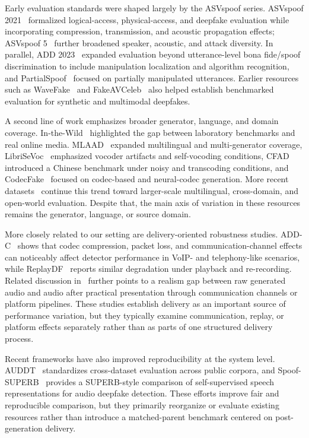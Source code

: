 Early evaluation standards were shaped largely by the ASVspoof series. ASVspoof 2021~\cite{liu2023asvspoof} formalized logical-access, physical-access, and deepfake evaluation while incorporating compression, transmission, and acoustic propagation effects; ASVspoof 5~\cite{wang2026asvspoof} further broadened speaker, acoustic, and attack diversity. In parallel, ADD 2023~\cite{yi2024add} expanded evaluation beyond utterance-level bona fide/spoof discrimination to include manipulation localization and algorithm recognition, and PartialSpoof~\cite{zhang202partial} focused on partially manipulated utterances. Earlier resources such as WaveFake~\cite{frank2021wavefake} and FakeAVCeleb~\cite{khalid2021fakeavceleb} also helped establish benchmarked evaluation for synthetic and multimodal deepfakes.

A second line of work emphasizes broader generator, language, and domain coverage. In-the-Wild~\cite{muller2022generalize} highlighted the gap between laboratory benchmarks and real online media. MLAAD~\cite{muller2024mlaad} expanded multilingual and multi-generator coverage, LibriSeVoc~\cite{sun2023ai} emphasized vocoder artifacts and self-vocoding conditions, CFAD~\cite{ma2024cfad} introduced a Chinese benchmark under noisy and transcoding conditions, and CodecFake~\cite{xie2025codecfake} focused on codec-based and neural-codec generation. More recent datasets~\cite{huang-etal-2025-speechfake,mawalim2025jmad,ciobanu2026xmad,wang2025audeter} continue this trend toward larger-scale multilingual, cross-domain, and open-world evaluation. Despite that, the main axis of variation in these resources remains the generator, language, or source domain.

More closely related to our setting are delivery-oriented robustness studies. ADD-C~\cite{shi2025benchmarking} shows that codec compression, packet loss, and communication-channel effects can noticeably affect detector performance in VoIP- and telephony-like scenarios, while ReplayDF~\cite{muller2025replay} reports similar degradation under playback and re-recording. Related discussion in~\cite{delgado2026presentation} further points to a realism gap between raw generated audio and audio after practical presentation through communication channels or platform pipelines. These studies establish delivery as an important source of performance variation, but they typically examine communication, replay, or platform effects separately rather than as parts of one structured delivery process.

Recent frameworks have also improved reproducibility at the system level. AUDDT~\cite{zhu2025auddt} standardizes cross-dataset evaluation across public corpora, and Spoof-SUPERB~\cite{ali2026superb} provides a SUPERB-style comparison of self-supervised speech representations for audio deepfake detection. These efforts improve fair and reproducible comparison, but they primarily reorganize or evaluate existing resources rather than introduce a matched-parent benchmark centered on post-generation delivery.

